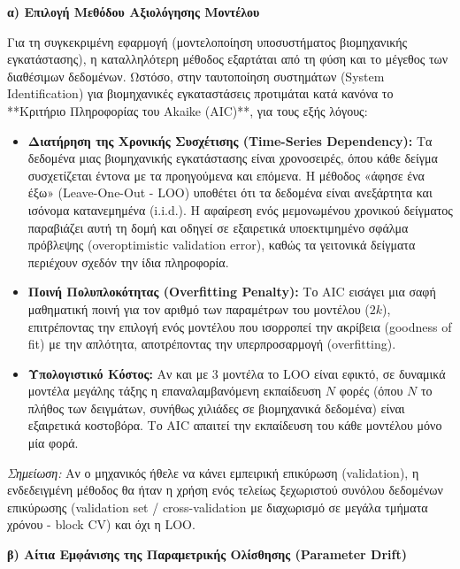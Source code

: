 \documentclass[a4paper,11pt]{article}
\begin{document}
\begin{answer}
\textbf{α) Επιλογή Μεθόδου Αξιολόγησης Μοντέλου}

Για τη συγκεκριμένη εφαρμογή (μοντελοποίηση υποσυστήματος βιομηχανικής εγκατάστασης), η καταλληλότερη μέθοδος εξαρτάται από τη φύση και το μέγεθος των διαθέσιμων δεδομένων. Ωστόσο, στην ταυτοποίηση συστημάτων (System Identification) για βιομηχανικές εγκαταστάσεις προτιμάται κατά κανόνα το **Κριτήριο Πληροφορίας του Akaike (AIC)**, για τους εξής λόγους:
\begin{itemize}
    \item \textbf{Διατήρηση της Χρονικής Συσχέτισης (Time-Series Dependency):} Τα δεδομένα μιας βιομηχανικής εγκατάστασης είναι χρονοσειρές, όπου κάθε δείγμα συσχετίζεται έντονα με τα προηγούμενα και επόμενα. Η μέθοδος «άφησε ένα έξω» (Leave-One-Out - LOO) υποθέτει ότι τα δεδομένα είναι ανεξάρτητα και ισόνομα κατανεμημένα (i.i.d.). Η αφαίρεση ενός μεμονωμένου χρονικού δείγματος παραβιάζει αυτή τη δομή και οδηγεί σε εξαιρετικά υποεκτιμημένο σφάλμα πρόβλεψης (overoptimistic validation error), καθώς τα γειτονικά δείγματα περιέχουν σχεδόν την ίδια πληροφορία.
    \item \textbf{Ποινή Πολυπλοκότητας (Overfitting Penalty):} Το AIC εισάγει μια σαφή μαθηματική ποινή για τον αριθμό των παραμέτρων του μοντέλου ($2k$), επιτρέποντας την επιλογή ενός μοντέλου που ισορροπεί την ακρίβεια (goodness of fit) με την απλότητα, αποτρέποντας την υπερπροσαρμογή (overfitting).
    \item \textbf{Υπολογιστικό Κόστος:} Αν και με 3 μοντέλα το LOO είναι εφικτό, σε δυναμικά μοντέλα μεγάλης τάξης η επαναλαμβανόμενη εκπαίδευση $N$ φορές (όπου $N$ το πλήθος των δειγμάτων, συνήθως χιλιάδες σε βιομηχανικά δεδομένα) είναι εξαιρετικά κοστοβόρα. Το AIC απαιτεί την εκπαίδευση του κάθε μοντέλου μόνο μία φορά.
\end{itemize}
\emph{Σημείωση:} Αν ο μηχανικός ήθελε να κάνει εμπειρική επικύρωση (validation), η ενδεδειγμένη μέθοδος θα ήταν η χρήση ενός τελείως ξεχωριστού συνόλου δεδομένων επικύρωσης (validation set / cross-validation με διαχωρισμό σε μεγάλα τμήματα χρόνου - block CV) και όχι η LOO.

\textbf{β) Αίτια Εμφάνισης της Παραμετρικής Ολίσθησης (Parameter Drift)}


\end{answer}
\end{document}
